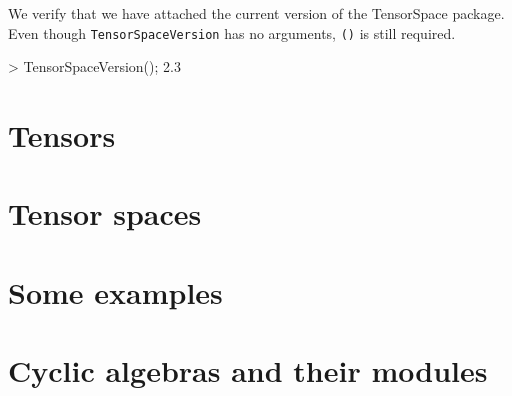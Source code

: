 \documentclass{documentation}
\begin{document}
\begin{example}[Version]
We verify that we have attached the current version of the TensorSpace package.
Even though \texttt{TensorSpaceVersion} has no arguments, \texttt{()} is still required.

\begin{code}
> TensorSpaceVersion();
2.3
\end{code}
\end{example}

\chapter{Tensors}\label{ch:tensors}




\chapter{Tensor spaces}\label{ch:tensor-spaces}



\chapter{Some examples}\label{ch:examples}



\appendix

\chapter{Cyclic algebras and their modules}\label{append:cyclic}



\backmatter
\end{document}
